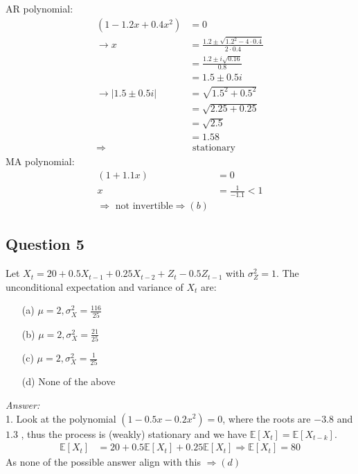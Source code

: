 \begin{footnotesize}
AR polynomial: 
\begin{align*}
    (1-1.2x + 0.4 x^2) &= 0 \\
    \rightarrow x &= \frac{1.2 \pm \sqrt{1.2^2 - 4 \cdot 0.4}}{2 \cdot 0.4}\\
    &= \frac{1.2 \pm i \sqrt{0.16}}{0.8} \\
    &= 1.5 \pm 0.5i \\
    \rightarrow \left| 1.5 \pm 0.5i \right| &= \sqrt{1.5^2 + 0.5^2} \\
    &= \sqrt{2.25 + 0.25} \\
    &= \sqrt{2.5} \\
    &= 1.58 \\
    \Rightarrow &\text{ stationary}
\end{align*}
MA polynomial:
\begin{align*}
    (1 + 1.1x) &= 0\\
    x &= \frac{1}{-1.1} < 1 \\
    \Rightarrow \text{ not invertible}
\Rightarrow (b)
\end{align*}

\end{footnotesize}

\subsection*{Question 5}

Let $X_t= 20 + 0.5X_{t-1} + 0.25 X_{t-2} + Z_t -0.5Z_{t-1}$ with $\sigma^2_Z = 1$. The unconditional expectation and variance of $X_t$ are:

\begin{itemize}
    \item[(a)] $\mu=2, \sigma_X^2=\frac{116}{25}$
    \item[(b)] $\mu=2, \sigma_X^2=\frac{21}{25}$ 
    \item[(c)] $\mu=2, \sigma_X^2=\frac{1}{25}$
    \item[(d)] None of the above
\end{itemize}

\begin{footnotesize}
    \textit{Answer:} \\
    1. Look at the polynomial $(1-0.5x-0.2x^2)=0$, where the roots are $-3.8$ and $1.3$ , thus the process is (weakly) stationary and we have $\mathbb{E}[X_t] = \mathbb{E}[X_{t-k}]$.
    \begin{align*}
        \mathbb{E}[X_t] &= 20 + 0.5\mathbb{E}[X_t] + 0.25\mathbb{E}[X_t] \Rightarrow \mathbb{E}[X_t]  = 80
    \end{align*}
    As none of the possible answer align with this $\Rightarrow (d)$
\end{footnotesize}

